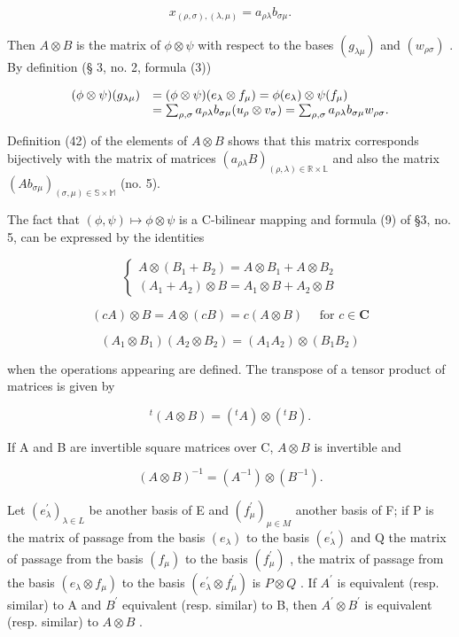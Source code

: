 \[
x _ {(\rho , \sigma), (\lambda , \mu)} = a _ {\rho \lambda} b _ {\sigma \mu}.\tag{42}
\]

Then \(A \otimes B\) is the matrix of \(\phi \otimes \psi\) with respect to the bases \((g_{\lambda \mu})\) and \((w_{\rho \sigma})\) . By definition (§ 3, no. 2, formula (3))

\[
\begin{array}{r l} (\phi \otimes \psi) (g _ {\lambda \mu}) & = (\phi \otimes \psi) (e _ {\lambda} \otimes f _ {\mu}) = \phi (e _ {\lambda}) \otimes \psi (f _ {\mu}) \\ & = \sum_ {\rho , \sigma} a _ {\rho \lambda} b _ {\sigma \mu} (u _ {\rho} \otimes v _ {\sigma}) = \sum_ {\rho , \sigma} a _ {\rho \lambda} b _ {\sigma \mu} w _ {\rho \sigma}. \end{array}
\]

Definition (42) of the elements of \(A \otimes B\) shows that this matrix corresponds bijectively with the matrix of matrices \((a_{\rho \lambda}B)_{(\rho, \lambda) \in \mathbb{R} \times \mathbb{L}}\) and also the matrix \((Ab_{\sigma \mu})_{(\sigma, \mu) \in \mathbb{S} \times \mathbb{M}}\) (no. 5).

The fact that \((\phi, \psi) \mapsto \phi \otimes \psi\) is a C-bilinear mapping and formula (9) of §3, no. 5, can be expressed by the identities

\[
\left\{ \begin{array}{l} A \otimes (B _ {1} + B _ {2}) = A \otimes B _ {1} + A \otimes B _ {2} \\ (A _ {1} + A _ {2}) \otimes B = A _ {1} \otimes B + A _ {2} \otimes B \end{array} \right.\tag{43}
\]

\[
(c A) \otimes B = A \otimes (c B) = c (A \otimes B) \quad \text { for } c \in \mathbf {C}\tag{44}
\]

\[
(A _ {1} \otimes B _ {1}) (A _ {2} \otimes B _ {2}) = (A _ {1} A _ {2}) \otimes (B _ {1} B _ {2})\tag{45}
\]

when the operations appearing are defined. The transpose of a tensor product of matrices is given by

\[
{ } ^ { t } ( A \otimes B ) = ( { } ^ { t } A ) \otimes ( { } ^ { t } B ) .\tag{46}
\]

If A and B are invertible square matrices over C, \(A \otimes B\) is invertible and

\[
(A \otimes B) ^ {- 1} = (A ^ {- 1}) \otimes (B ^ {- 1}).\tag{47}
\]

Let \((e_{\lambda}^{\prime})_{\lambda \in L}\) be another basis of E and \((f_{\mu}^{\prime})_{\mu \in M}\) another basis of F; if P is the matrix of passage from the basis \((e_{\lambda})\) to the basis \((e_{\lambda}^{\prime})\) and Q the matrix of passage from the basis \((f_{\mu})\) to the basis \((f_{\mu}^{\prime})\) , the matrix of passage from the basis \((e_{\lambda} \otimes f_{\mu})\) to the basis \((e_{\lambda}^{\prime} \otimes f_{\mu}^{\prime})\) is \(P \otimes Q\) . If \(A^{\prime}\) is equivalent (resp. similar) to A and \(B^{\prime}\) equivalent (resp. similar) to B, then \(A^{\prime} \otimes B^{\prime}\) is equivalent (resp. similar) to \(A \otimes B\) .

